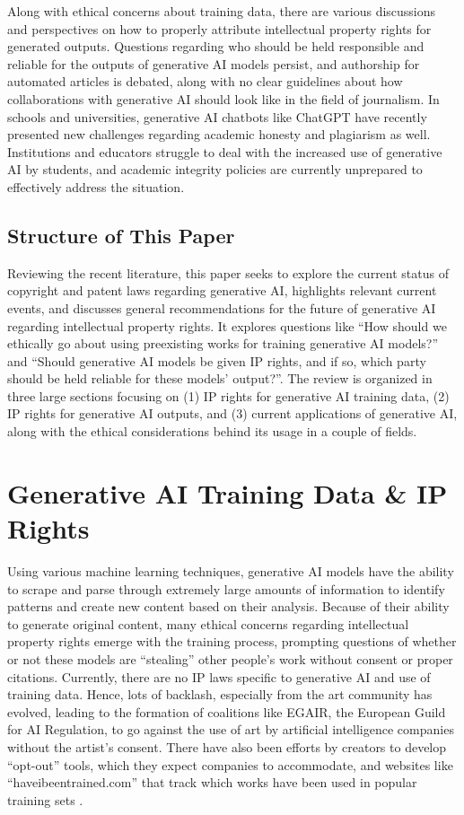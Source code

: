 \documentclass[manuscript,screen]{acmart}
\begin{document}
Along with ethical concerns about training data, there are various discussions and perspectives on how to properly attribute intellectual property rights for generated outputs. Questions regarding who should be held responsible and reliable for the outputs of generative AI models persist, and authorship for automated articles is debated, along with no clear guidelines about how collaborations with generative AI should look like in the field of journalism. In schools and universities, generative AI chatbots like ChatGPT have recently presented new challenges regarding academic honesty and plagiarism as well. Institutions and educators struggle to deal with the increased use of generative AI by students, and academic integrity policies are currently unprepared to effectively address the situation. 

\subsection{Structure of This Paper}
Reviewing the recent literature, this paper seeks to explore the current status of copyright and patent laws regarding generative AI, highlights relevant current events, and discusses general recommendations for the future of generative AI regarding intellectual property rights. It explores questions like “How should we ethically go about using preexisting works for training generative AI models?” and “Should generative AI models be given IP rights, and if so, which party should be held reliable for these models’ output?”. The review is organized in three large sections focusing on (1) IP rights for generative AI training data, (2) IP rights for generative AI outputs, and (3) current applications of generative AI, along with the ethical considerations behind its usage in a couple of fields.

\section{Generative AI Training Data \& IP Rights}
Using various machine learning techniques, generative AI models have the ability to scrape and parse through extremely large amounts of information to identify patterns and create new content based on their analysis. Because of their ability to generate original content, many ethical concerns regarding intellectual property rights emerge with the training process, prompting questions of whether or not these models are “stealing” other people’s work without consent or proper citations. Currently, there are no IP laws specific to generative AI and use of training data. Hence, lots of backlash, especially from the art community has evolved, leading to the formation of coalitions like EGAIR, the European Guild for AI Regulation, to go against the use of art by artificial intelligence companies without the artist’s consent. There have also been efforts by creators to develop “opt-out” tools, which they expect companies to accommodate, and websites like “haveibeentrained.com” that track which works have been used in popular training sets \cite{PAPER:10}.
\end{document}
